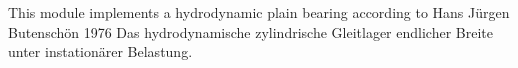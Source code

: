%
%
%


This module implements a hydrodynamic plain bearing according to Hans J\"urgen Butensch\"on 1976 Das hydrodynamische zylindrische Gleitlager endlicher Breite unter instation\"arer Belastung.

